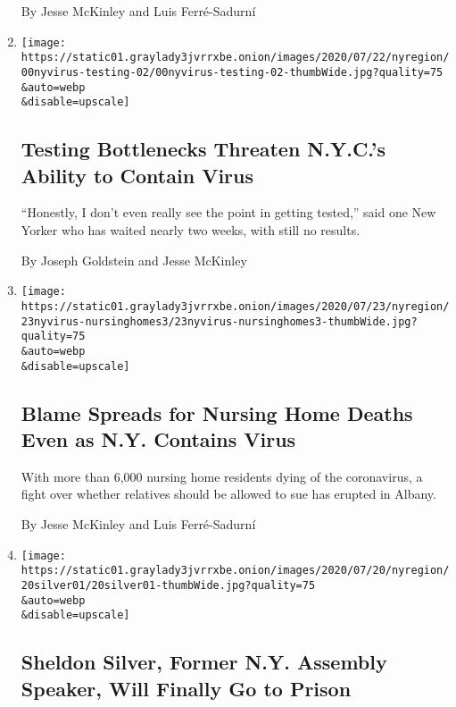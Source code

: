 \begin{enumerate}
  By Jesse McKinley and Luis Ferré-Sadurní
\item
  \href{/2020/07/23/nyregion/coronavirus-testing-nyc.html}{}

  \texttt{[image: https://static01.graylady3jvrrxbe.onion/images/2020/07/22/nyregion/00nyvirus-testing-02/00nyvirus-testing-02-thumbWide.jpg?quality=75\\\&auto=webp\\\&disable=upscale]}

  \hypertarget{testing-bottlenecks-threaten-nycs-ability-to-contain-virus}{%
  \subsection{Testing Bottlenecks Threaten N.Y.C.'s Ability to Contain
  Virus}\label{testing-bottlenecks-threaten-nycs-ability-to-contain-virus}}

  ``Honestly, I don't even really see the point in getting tested,''
  said one New Yorker who has waited nearly two weeks, with still no
  results.

  By Joseph Goldstein and Jesse McKinley
\item
  \href{/2020/07/23/nyregion/nursing-homes-deaths-cuomo.html}{}

  \texttt{[image: https://static01.graylady3jvrrxbe.onion/images/2020/07/23/nyregion/23nyvirus-nursinghomes3/23nyvirus-nursinghomes3-thumbWide.jpg?quality=75\\\&auto=webp\\\&disable=upscale]}

  \hypertarget{blame-spreads-for-nursing-home-deaths-even-as-ny-contains-virus}{%
  \subsection{Blame Spreads for Nursing Home Deaths Even as N.Y.
  Contains
  Virus}\label{blame-spreads-for-nursing-home-deaths-even-as-ny-contains-virus}}

  With more than 6,000 nursing home residents dying of the coronavirus,
  a fight over whether relatives should be allowed to sue has erupted in
  Albany.

  By Jesse McKinley and Luis Ferré-Sadurní
\item
  \href{/2020/07/20/nyregion/sheldon-silver-sentencing-prison.html}{}

  \texttt{[image: https://static01.graylady3jvrrxbe.onion/images/2020/07/20/nyregion/20silver01/20silver01-thumbWide.jpg?quality=75\\\&auto=webp\\\&disable=upscale]}

  \hypertarget{sheldon-silver-former-ny-assembly-speaker-will-finally-go-to-prison}{%
  \subsection{Sheldon Silver, Former N.Y. Assembly Speaker, Will Finally
  Go to
  Prison}\label{sheldon-silver-former-ny-assembly-speaker-will-finally-go-to-prison}}


\end{enumerate}

